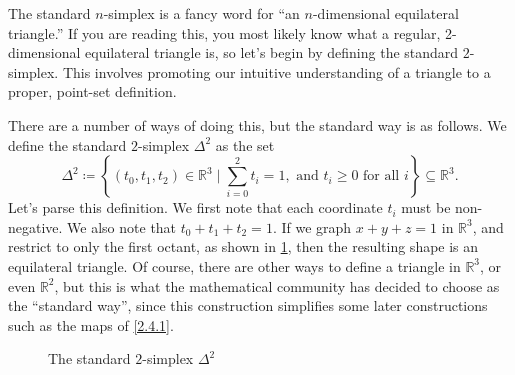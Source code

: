 The standard $n$-simplex is a fancy word for ``an $n$-dimensional equilateral triangle.'' If you are reading this, you most likely know what a regular, 2-dimensional equilateral triangle is, so let's begin by defining the standard $2$-simplex. This involves promoting our intuitive understanding of a triangle to a proper, point-set definition.

There are a number of ways of doing this, but the standard way is as follows. We define the standard $2$-simplex $\Delta^2$ as the set
\[
\Delta^2 \coloneqq \left\{(t_0,t_1,t_2)\in\mathbb{R}^3 \mid \sum_{i=0}^2 t_i = 1,\text{ and } t_i\geq 0 \text{ for all  } i\right\}\subseteq\mathbb{R}^3.
\]
Let's parse this definition. We first note that each coordinate $t_i$ must be non-negative. We also note that $t_0+t_1+t_2=1$. If we graph $x+y+z=1$ in $\mathbb{R}^3$, and restrict to only the first octant, as shown in \cref{fig:1}, then the resulting shape is an equilateral triangle. Of course, there are other ways to define a triangle in $\mathbb{R}^3$, or even $\mathbb{R}^2$, but this is what the mathematical community has decided to choose as the ``standard way'', since this construction simplifies some later constructions such as the maps of \cref{2.4.1}.
\begin{figure}[ht]
\centering
\caption{The standard $2$-simplex $\Delta^2$}\label{fig:1}
\end{figure}

